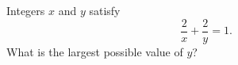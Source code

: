 Integers $x$ and $y$ satisfy
\[\dfrac{2}{x}+\dfrac{2}{y}=1 .\]
What is the largest possible value of $y$?
